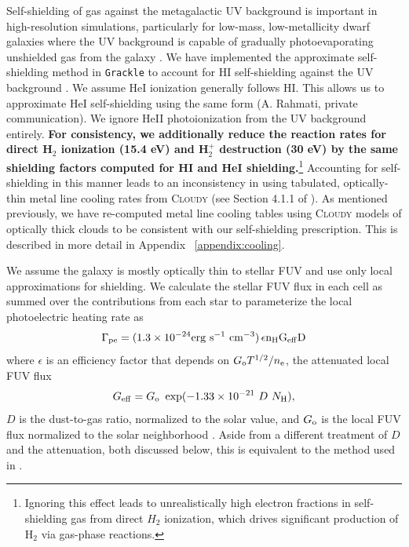 \documentclass[fleqn,usenatbib,useAMS]{mnras}
\begin{document}
Self-shielding of gas against the metagalactic UV background is important in high-resolution simulations, particularly for low-mass, low-metallicity dwarf galaxies where the UV background is capable of gradually photoevaporating unshielded gas from the galaxy \citep{Simpson2013}. We have implemented the \citet{Rahmati2013} approximate self-shielding method in \texttt{Grackle} to account for HI self-shielding against the UV background \citep[see][ for more details of this implementation]{GrackleMethod}. We assume HeI ionization generally follows HI. This allows us to approximate HeI self-shielding using the same form (A. Rahmati, private communication). We ignore HeII photoionization from the UV background entirely. {\bf For consistency, we additionally reduce the reaction rates for direct H$_2$ ionization (15.4 eV) and H$_2^+$ destruction (30 eV) by the same shielding factors computed for HI and HeI shielding.}\footnote{Ignoring this effect leads to unrealistically high electron fractions in self-shielding gas from direct $H_2$ ionization, which drives significant production of H$_2$ via gas-phase reactions.} Accounting for self-shielding in this manner leads to an inconsistency in using tabulated, optically-thin metal line cooling rates from \textsc{Cloudy} (see Section 4.1.1 of \citet{Hu2017}). As mentioned previously, we have re-computed metal line cooling tables using \textsc{Cloudy} models of optically thick clouds to be consistent with our self-shielding prescription. This is described in more detail in Appendix ~\ref{appendix:cooling}. 


We assume the galaxy is mostly optically thin to stellar FUV and use only local approximations for shielding.  We calculate the stellar FUV flux in each cell as summed over the contributions from each star to parameterize the local photoelectric heating rate as \citep{BakesTielens1994,Wolfire2003,Bergin2004}
\begin{equation}
\label{eq:PE}
\Gamma_{\rm pe} = (1.3 \times 10^{-24} \rm{erg~s^{-1}~cm^{-3}})\, \epsilon n_{\rm H} G_{\rm eff} D 
\end{equation}
where $\epsilon$ is an efficiency factor that depends on $G_{\rm{o}} T^{1/2} /n_{\rm{e}}$, the attenuated local FUV flux \begin{equation} G_{\rm eff} = G_{\rm o}~\exp(-1.33\times10^{-21}~D~N_{\rm H}), \end{equation} $D$ is the dust-to-gas ratio, normalized to the solar value, and $G_{\rm o}$ is the local FUV flux normalized to the solar neighborhood \citep{Habing1968}. Aside from a different treatment of $D$ and the attenuation, both discussed below, this is equivalent to the method used in \citet{Hu2016,Hu2017}.
\end{document}
